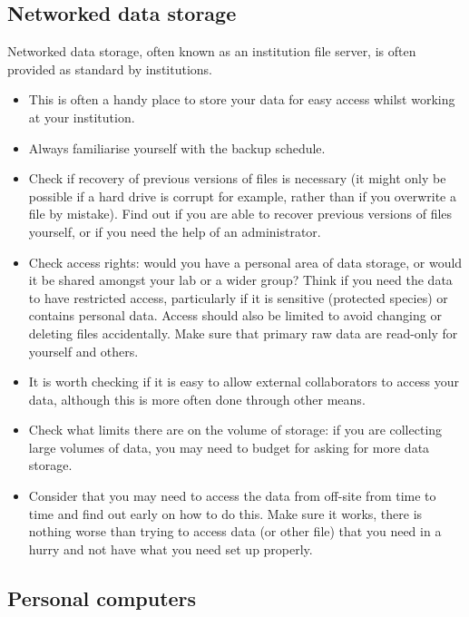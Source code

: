 \documentclass[12pt,a4paper,oneside]{report}
\providecommand{\tightlist}{%
  \setlength{\itemsep}{0pt}\setlength{\parskip}{0pt}}
\begin{document}
\hypertarget{networked-data-storage}{%
\subsection{Networked data storage}\label{networked-data-storage}}

Networked data storage, often known as an institution file server, is
often provided as standard by institutions.

\begin{itemize}
\tightlist
\item
  This is often a handy place to store your data for easy access whilst
  working at your institution.
\item
  Always familiarise yourself with the backup schedule.
\item
  Check if recovery of previous versions of files is necessary (it might
  only be possible if a hard drive is corrupt for example, rather than
  if you overwrite a file by mistake). Find out if you are able to
  recover previous versions of files yourself, or if you need the help
  of an administrator.
\item
  Check access rights: would you have a personal area of data storage,
  or would it be shared amongst your lab or a wider group? Think if you
  need the data to have restricted access, particularly if it is
  sensitive (protected species) or contains personal data. Access should
  also be limited to avoid changing or deleting files accidentally. Make
  sure that primary raw data are read-only for yourself and others.
\item
  It is worth checking if it is easy to allow external collaborators to
  access your data, although this is more often done through other
  means.
\item
  Check what limits there are on the volume of storage: if you are
  collecting large volumes of data, you may need to budget for asking
  for more data storage.
\item
  Consider that you may need to access the data from off-site from time
  to time and find out early on how to do this. Make sure it works,
  there is nothing worse than trying to access data (or other file) that
  you need in a hurry and not have what you need set up properly.
\end{itemize}

\hypertarget{personal-computers}{%
\subsection{Personal computers}\label{personal-computers}}
\end{document}
